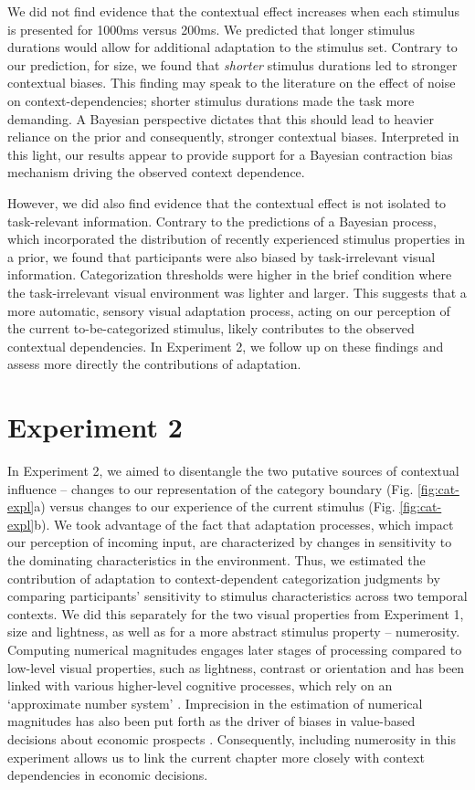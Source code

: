 \documentclass[a4paper, nobind]{templates/ociamthesis}
\begin{document}
We did not find evidence that the contextual effect increases when each stimulus is presented for 1000ms versus 200ms. We predicted that longer stimulus durations would allow for additional adaptation to the stimulus set. Contrary to our prediction, for size, we found that \emph{shorter} stimulus durations led to stronger contextual biases. This finding may speak to the literature on the effect of noise on context-dependencies; shorter stimulus durations made the task more demanding. A Bayesian perspective dictates that this should lead to heavier reliance on the prior and consequently, stronger contextual biases. Interpreted in this light, our results appear to provide support for a Bayesian contraction bias mechanism driving the observed context dependence.

However, we did also find evidence that the contextual effect is not isolated to task-relevant information. Contrary to the predictions of a Bayesian process, which incorporated the distribution of recently experienced stimulus properties in a prior, we found that participants were also biased by task-irrelevant visual information. Categorization thresholds were higher in the brief condition where the task-irrelevant visual environment was lighter and larger. This suggests that a more automatic, sensory visual adaptation process, acting on our perception of the current to-be-categorized stimulus, likely contributes to the observed contextual dependencies. In Experiment 2, we follow up on these findings and assess more directly the contributions of adaptation.

\hypertarget{experiment-2-1}{%
\section{Experiment 2}\label{experiment-2-1}}

In Experiment 2, we aimed to disentangle the two putative sources of contextual influence -- changes to our representation of the category boundary (Fig. \ref{fig:cat-expl}a) versus changes to our experience of the current stimulus (Fig. \ref{fig:cat-expl}b). We took advantage of the fact that adaptation processes, which impact our perception of incoming input, are characterized by changes in sensitivity to the dominating characteristics in the environment. Thus, we estimated the contribution of adaptation to context-dependent categorization judgments by comparing participants' sensitivity to stimulus characteristics across two temporal contexts. We did this separately for the two visual properties from Experiment 1, size and lightness, as well as for a more abstract stimulus property -- numerosity. Computing numerical magnitudes engages later stages of processing compared to low-level visual properties, such as lightness, contrast or orientation \autocite{heng2020} and has been linked with various higher-level cognitive processes, which rely on an `approximate number system' \autocite{piazza2007,nieder2009}. Imprecision in the estimation of numerical magnitudes has also been put forth as the driver of biases in value-based decisions about economic prospects \autocite{woodford2020}. Consequently, including numerosity in this experiment allows us to link the current chapter more closely with context dependencies in economic decisions.
\end{document}
